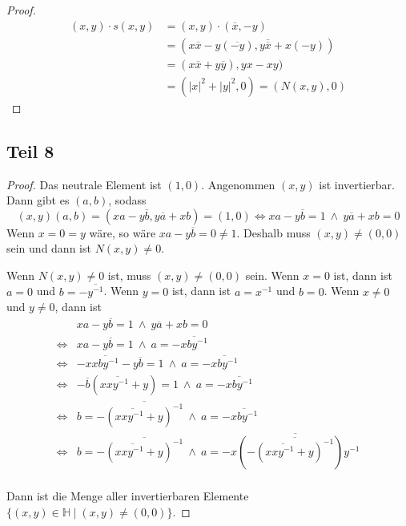 \documentclass[10pt,a4paper]{article}
\begin{document}
\begin{proof}
\begin{align*}
(x, y) \cdot s(x, y) & = (x, y) \cdot (\overline{x}, -y)\\
& = (x\overline{x} - y(\overline{-y}), y\overline{\overline{x}} + x(-y))\\
& = (x\overline{x} + y\overline{y}), yx - xy)\\
& = (|x|^{2} + |y|^{2}, 0) = (N(x, y), 0)
\end{align*}
\end{proof}

\subsection*{Teil 8}

\begin{proof}
Das neutrale Element ist $(1, 0)$.
Angenommen $(x, y)$ ist invertierbar.
Dann gibt es $(a, b)$, sodass
\begin{equation}
(x, y)(a, b) = (xa - y\overline{b}, y\overline{a} + xb) = (1, 0) \Leftrightarrow xa - y\overline{b} = 1\ \land\ y\overline{a} + xb = 0
\end{equation}
Wenn $x = 0 = y$ wäre, so wäre $xa - y\overline{b} = 0 \ne 1$.
Deshalb muss $(x, y) \ne (0, 0)$ sein und dann ist $N(x, y) \ne 0$.

Wenn $N(x, y) \ne 0$ ist, muss $(x, y) \ne (0, 0)$ sein.
Wenn $x = 0$ ist, dann ist $a = 0$ und $b = -\overline{y^{-1}}$.
Wenn $y = 0$ ist, dann ist $a = x^{-1}$ und $b = 0$.
Wenn $x \ne 0$ und $y \ne 0$, dann ist
\begin{align*}
& xa - y\overline{b} = 1\ \land\ y\overline{a} + xb = 0\\
\Leftrightarrow & xa - y\overline{b} = 1\ \land\ a = -\overline{xby^{-1}}\\
\Leftrightarrow & -x\overline{xby^{-1}} - y\overline{b} = 1\ \land\ a = -\overline{xby^{-1}}\\
\Leftrightarrow & -\overline{b}(x\overline{xy^{-1}} + y) = 1\ \land\ a = -\overline{xby^{-1}}\\
\Leftrightarrow & b = -\overline{(x\overline{xy^{-1}} + y)^{-1}}\ \land\ a = -\overline{xby^{-1}}\\
\Leftrightarrow & b = -\overline{(x\overline{xy^{-1}} + y)^{-1}}\ \land\ a = -\overline{x(-\overline{(x\overline{xy^{-1}} + y)^{-1}})y^{-1}}\\
\end{align*}

Dann ist die Menge aller invertierbaren Elemente $\{ (x, y) \in \mathbb{H} \mid (x, y) \ne (0, 0) \}$.
\end{proof}
\end{document}
